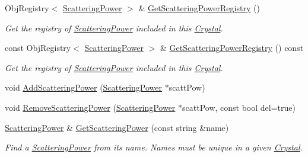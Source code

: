 \begin{DoxyCompactItemize}
Obj\+Registry$<$ \mbox{\hyperlink{class_obj_cryst_1_1_scattering_power}{Scattering\+Power}} $>$ \& \mbox{\hyperlink{class_obj_cryst_1_1_crystal_a98b594908ebbdf25249965eaf61eccdc}{Get\+Scattering\+Power\+Registry}} ()
\begin{DoxyCompactList}\small\item\em Get the registry of \mbox{\hyperlink{class_obj_cryst_1_1_scattering_power}{Scattering\+Power}} included in this \mbox{\hyperlink{class_obj_cryst_1_1_crystal}{Crystal}}. \end{DoxyCompactList}\item 
\mbox{\label{class_obj_cryst_1_1_crystal_a4db6dafa47e45e028385958a24dd52f2}} 
const Obj\+Registry$<$ \mbox{\hyperlink{class_obj_cryst_1_1_scattering_power}{Scattering\+Power}} $>$ \& \mbox{\hyperlink{class_obj_cryst_1_1_crystal_a4db6dafa47e45e028385958a24dd52f2}{Get\+Scattering\+Power\+Registry}} () const
\begin{DoxyCompactList}\small\item\em Get the registry of \mbox{\hyperlink{class_obj_cryst_1_1_scattering_power}{Scattering\+Power}} included in this \mbox{\hyperlink{class_obj_cryst_1_1_crystal}{Crystal}}. \end{DoxyCompactList}\item 
void \mbox{\hyperlink{class_obj_cryst_1_1_crystal_a76d2d19234fbc5733f5c565a4bf9a1c7}{Add\+Scattering\+Power}} (\mbox{\hyperlink{class_obj_cryst_1_1_scattering_power}{Scattering\+Power}} $\ast$scatt\+Pow)
\item 
void \mbox{\hyperlink{class_obj_cryst_1_1_crystal_aba839003a614634d7d6d9217379ae692}{Remove\+Scattering\+Power}} (\mbox{\hyperlink{class_obj_cryst_1_1_scattering_power}{Scattering\+Power}} $\ast$scatt\+Pow, const bool del=true)
\item 
\mbox{\label{class_obj_cryst_1_1_crystal_a35fbd16819629ecccea733c0503eaf47}} 
\mbox{\hyperlink{class_obj_cryst_1_1_scattering_power}{Scattering\+Power}} \& \mbox{\hyperlink{class_obj_cryst_1_1_crystal_a35fbd16819629ecccea733c0503eaf47}{Get\+Scattering\+Power}} (const string \&name)
\begin{DoxyCompactList}\small\item\em Find a \mbox{\hyperlink{class_obj_cryst_1_1_scattering_power}{Scattering\+Power}} from its name. Names must be unique in a given \mbox{\hyperlink{class_obj_cryst_1_1_crystal}{Crystal}}. \end{DoxyCompactList}\item 

\end{DoxyCompactItemize}
